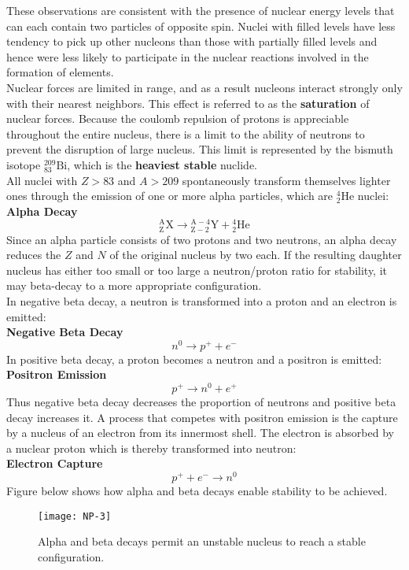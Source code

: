 These observations are consistent with the presence of nuclear energy levels that can each contain two particles of opposite spin. Nuclei with filled levels have less tendency to pick up other nucleons than those with partially filled levels and hence were less likely to participate in the nuclear reactions involved in the formation of elements.\\
Nuclear forces are limited in range, and as a result nucleons interact strongly only with their nearest neighbors. This effect is referred to as the \textbf{saturation} of nuclear forces. Because the coulomb repulsion of protons is appreciable throughout the entire nucleus, there is a limit to the ability of neutrons to prevent the disruption of large nucleus. This limit is represented by the bismuth isotope ${ }_{83}^{209} \mathrm{Bi}$, which is the \textbf{heaviest stable} nuclide.\\
All nuclei with $Z>83$ and $A>209$ spontaneously transform themselves lighter ones through the emission of one or more alpha particles, which are ${ }_2^4 \mathrm{He}$ nuclei:\\
\textbf{Alpha Decay }
$${ }_{\mathrm{Z}}^{\mathrm{A}} \mathrm{X} \rightarrow{ }_{\mathrm{Z}-2}^{\mathrm{A}-4} \mathrm{Y}+{ }_2^4 \mathrm{He}$$
Since an alpha particle consists of two protons and two neutrons, an alpha decay reduces the $Z$ and $N$ of the original nucleus by two each. If the resulting daughter nucleus has either too small or too large a neutron/proton ratio for stability, it may beta-decay to a more appropriate configuration.\\
In negative beta decay, a neutron is transformed into a proton and an electron is emitted:\\
\textbf{Negative Beta Decay}
$$
n^0 \rightarrow p^{+}+e^{-}
$$
In positive beta decay, a proton becomes a neutron and a positron is emitted:\\
\textbf{Positron Emission}
$$
p^{+} \rightarrow n^0+e^{+}
$$
Thus negative beta decay decreases the proportion of neutrons and positive beta decay increases it. A process that competes with positron emission is the capture by a nucleus of an electron from its innermost shell. The electron is absorbed by a nuclear proton which is thereby transformed into neutron:\\
\textbf{Electron Capture}
$$
p^{+}+e^{-} \rightarrow n^0
$$
Figure below shows how alpha and beta decays enable stability to be achieved.
\begin{figure}[H]
	\centering
	\texttt{[image: NP-3]}
	\caption{Alpha and beta decays permit an unstable nucleus to reach a stable configuration.}
	\label{}
\end{figure}
